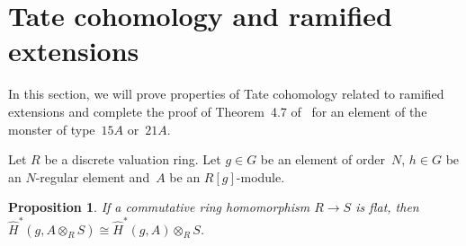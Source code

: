 \documentclass[10pt,a4paper]{amsart}
\numberwithin{equation}{section}
\newtheorem{Proposition}[Theorem]{Proposition}
 { \theoremstyle{definition}
\newtheorem{Definition}[Theorem]{Definition}
\newtheorem{Note}[Theorem]{Note}
\newtheorem{Example}[Theorem]{Example}
\newtheorem{Remark}[Theorem]{Remark} }
\begin{document}
\section{Tate cohomology and ramified extensions}\label{section4}

In this section, we will prove properties of Tate cohomology related to ramified extensions and complete the proof of Theorem~4.7 of~\cite{BR} for an element of the monster of type~$15A $ or~$21A$.

Let $R$ be a discrete valuation ring. Let $g \in G$ be an element of order~$N$, $h \in G$ be an $N$-regular element and~$A$ be an $R[g]$-module.

\begin{Proposition}\label{tensor}
If a commutative ring homomorphism $R \rightarrow S$ is flat, then $\hat{H}^*(g,A\otimes_{R}S)\cong \hat{H}^*(g,A)\otimes_{R}S$.
\end{Proposition}
\end{document}
